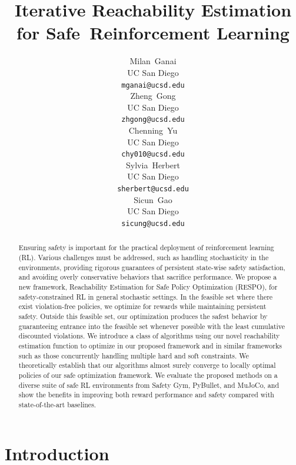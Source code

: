\documentclass{article}
\title{Iterative Reachability Estimation for Safe~Reinforcement Learning}
\author{%
  Milan~Ganai\\
  UC San Diego\\
  \texttt{mganai@ucsd.edu} \\
   \And
  Zheng~Gong\\
  UC San Diego\\
  \texttt{zhgong@ucsd.edu} \\
  \And
  Chenning~Yu\\
  UC San Diego\\
  \texttt{chy010@ucsd.edu} \\
  \AND
  Sylvia~Herbert\\
  UC San Diego\\
  \texttt{sherbert@ucsd.edu} \\
 \And
  Sicun~Gao\\
  UC San Diego\\
  \texttt{sicung@ucsd.edu} \\
}
\theoremstyle{definition}
\begin{document}
\maketitle



\begin{abstract}
    Ensuring safety is important for the practical deployment of reinforcement learning (RL). Various challenges must be addressed, such as handling stochasticity in the environments, providing rigorous guarantees of persistent state-wise safety satisfaction, and avoiding overly conservative behaviors that sacrifice performance. We propose a new framework, Reachability Estimation for Safe Policy Optimization (RESPO), for safety-constrained RL in general stochastic settings. In the feasible set where there exist violation-free policies, we optimize for rewards while maintaining persistent safety. Outside this feasible set, our optimization produces the safest behavior by guaranteeing entrance into the feasible set whenever possible with the least cumulative discounted violations. We introduce a class of algorithms using our novel reachability estimation function to optimize in our proposed framework and in similar frameworks such as those concurrently handling multiple hard and soft constraints. We theoretically establish that our algorithms almost surely converge to locally optimal policies of our safe optimization framework. We evaluate the proposed methods on a diverse suite of safe RL environments from Safety Gym, PyBullet, and MuJoCo, and show the benefits in improving both reward performance and safety compared with state-of-the-art baselines.
     
    
    
    



\end{abstract}



\section{Introduction}
\vspace{-5pt}
\label{section:Intro}
\end{document}
